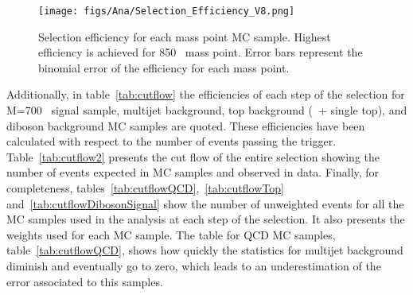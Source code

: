 \begin{figure}[!Hhtbp]
  \begin{center}
    \texttt{[image: figs/Ana/Selection\_Efficiency\_V8.png]}
    \caption{Selection efficiency for each mass point MC sample. Highest efficiency is achieved for 850 \GeVcc~mass point. Error bars represent the binomial error of the efficiency for each mass point.}
    \label{fig:MPEff}
  \end{center}
\end{figure}

Additionally, in table~\ref{tab:cutflow} the efficiencies of each step of the selection for M=700 \GeVcc~signal sample, multijet background, top background (\ttbar~+ single top), and diboson background MC samples are quoted. These efficiencies have been calculated with respect to the number of events passing the trigger. Table~\ref{tab:cutflow2} presents the cut flow of the entire selection showing the number of events expected in MC samples and observed in data. Finally, for completeness, tables~\ref{tab:cutflowQCD},~\ref{tab:cutflowTop} and~\ref{tab:cutflowDibosonSignal} show the number of unweighted events for all the MC samples used in the analysis at each step of the selection. It also presents the weights used for each MC sample. The table for QCD MC samples, table~\ref{tab:cutflowQCD}, shows how quickly the statistics for multijet background diminish and eventually go to zero, which leads to an underestimation of the error associated to this samples. 

